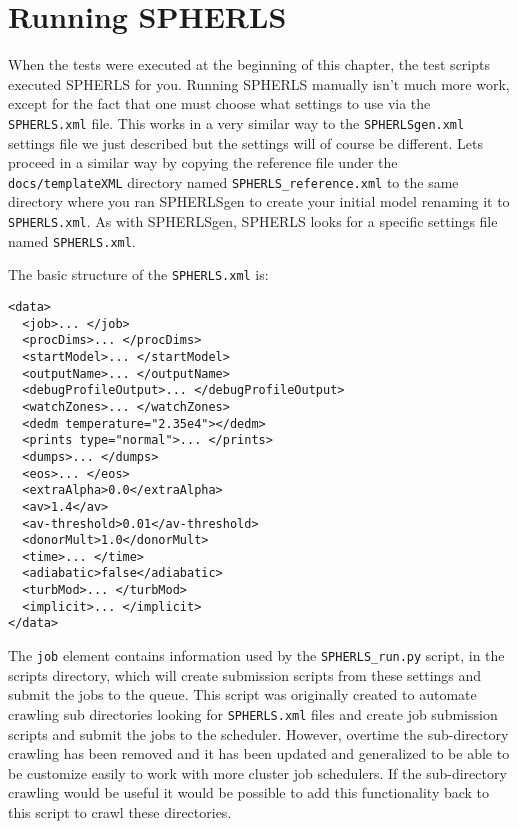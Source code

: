 \documentclass[12pt,a4paper]{book}
\begin{document}
\section{Running SPHERLS}
\label{sec:running}
When the tests were executed at the beginning of this chapter, the test scripts executed SPHERLS for you. Running SPHERLS manually isn't much more work, except for the fact that one must choose what settings to use via the {\tt SPHERLS.xml} file. This works in a very similar way to the {\tt SPHERLSgen.xml} settings file we just described but the settings will of course be different. Lets proceed in a similar way by copying the reference file under the {\tt docs/templateXML} directory named {\tt SPHERLS\_reference.xml} to the same directory where you ran SPHERLSgen to create your initial model renaming it to {\tt SPHERLS.xml}. As with SPHERLSgen, SPHERLS looks for a specific settings file named {\tt SPHERLS.xml}.

The basic structure of the {\tt SPHERLS.xml} is:

\begin{verbatim}
<data>
  <job>... </job>
  <procDims>... </procDims>
  <startModel>... </startModel>
  <outputName>... </outputName>
  <debugProfileOutput>... </debugProfileOutput>
  <watchZones>... </watchZones>
  <dedm temperature="2.35e4"></dedm>
  <prints type="normal">... </prints>
  <dumps>... </dumps>
  <eos>... </eos>
  <extraAlpha>0.0</extraAlpha>
  <av>1.4</av>
  <av-threshold>0.01</av-threshold>
  <donorMult>1.0</donorMult>
  <time>... </time>
  <adiabatic>false</adiabatic>
  <turbMod>... </turbMod>
  <implicit>... </implicit>
</data>
\end{verbatim}

The {\tt job} element contains information used by the {\tt SPHERLS\_run.py} script, in the scripts directory, which will create submission scripts from these settings and submit the jobs to the queue. This script was originally created to automate crawling sub directories looking for {\tt SPHERLS.xml} files and create job submission scripts and submit the jobs to the scheduler. However, overtime the sub-directory crawling has been removed and it has been updated and generalized to be able to be customize easily to work with more cluster job schedulers. If the sub-directory crawling would be useful it would be possible to add this functionality back to this script to crawl these directories.
\end{document}
